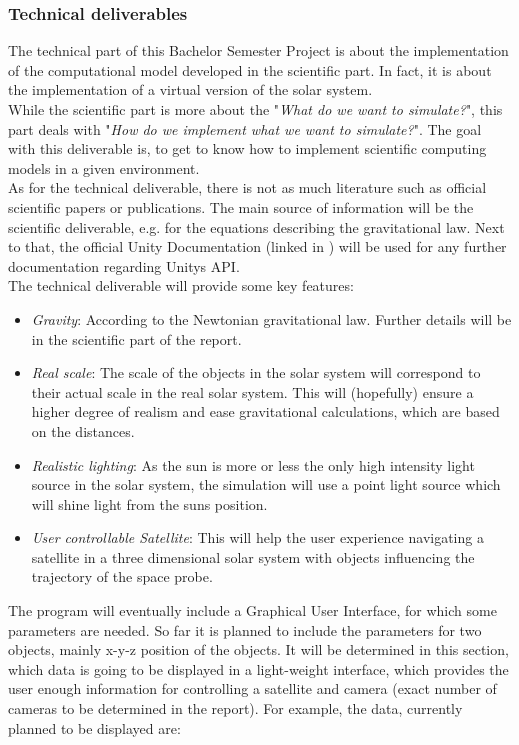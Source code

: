 \documentclass[conference,compsoc]{IEEEtran}
\begin{document}
\subsubsection{Technical deliverables}
The technical part of this Bachelor Semester Project is about the implementation of the computational model developed in the scientific part. In fact, it is about the implementation of a virtual version of the solar system. \\
While the scientific part is more about the "\emph{What do we want to simulate?}", this part deals with "\emph{How do we implement what we want to simulate?}". The goal with this deliverable is, to get to know how to implement scientific computing models in a given environment. \\
As for the technical deliverable, there is not as much literature such as official scientific papers or publications. The main source of information will be the scientific deliverable, e.g. for the equations describing the gravitational law. Next to that, the official Unity Documentation (linked in \cite{UnityDoc}) will be used for any further documentation regarding Unitys API. \\ 
The technical deliverable will provide some key features:
\begin{itemize}
	\item \emph{Gravity}: According to the Newtonian gravitational law. Further details will be in the scientific part of the report.
	\item \emph{Real scale}: The scale of the objects in the solar system will correspond to their actual scale in the real solar system. This will (hopefully) ensure a higher degree of realism and ease gravitational calculations, which are based on the distances.
	\item \emph{Realistic lighting}: As the sun is more or less the only high intensity light source in the solar system, the simulation will use a point light source which will shine light from the suns position. 
	\item \emph{User controllable Satellite}: This will help the user experience navigating a satellite in a three dimensional solar system with objects influencing the trajectory of the space probe.
\end{itemize}
The program will eventually include a Graphical User Interface, for which some parameters are needed. So far it is planned to include the parameters for two objects, mainly x-y-z position of the objects. It will be determined in this section, which data is going to be displayed in a light-weight interface, which provides the user enough information for controlling a satellite and camera (exact number of cameras to be determined in the report). For example, the data, currently planned to be displayed are: 
\end{document}
